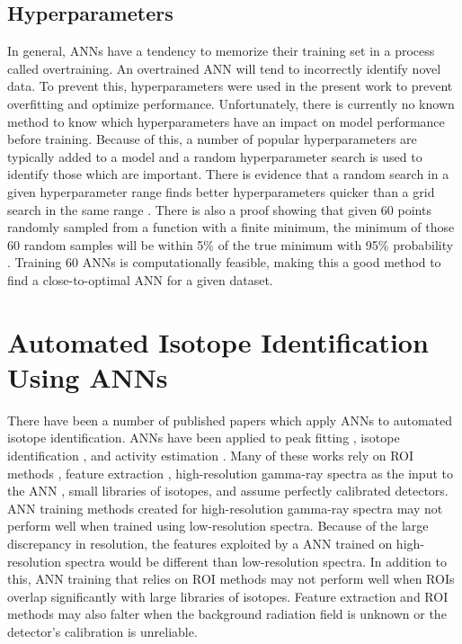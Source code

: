 \documentclass[tocnosub,noragright,centerchapter,12pt,fullpage]{uiucecethesis09}
\begin{document}
\subsection{Hyperparameters}

In general, ANNs have a tendency to memorize their training set in a process called overtraining. An overtrained ANN will tend to incorrectly identify novel data. To prevent this, hyperparameters were used in the present work to prevent overfitting and optimize performance. Unfortunately, there is currently no known method to know which hyperparameters have an impact on model performance before training. Because of this, a number of popular hyperparameters are typically added to a model and a random hyperparameter search is used to identify those which are important. There is evidence that a random search in a given hyperparameter range finds better hyperparameters quicker than a grid search in the same range \cite{Bergstra2012}. There is also a proof showing that given 60 points randomly sampled from a function with a finite minimum, the minimum of those 60 random samples will be within 5\% of the true minimum with 95\% probability \cite{Zheng2015}. Training 60 ANNs is computationally feasible, making this a good method to find a close-to-optimal ANN for a given dataset. 



\section{Automated Isotope Identification Using ANNs}

There have been a number of published papers which apply ANNs to automated isotope identification. ANNs have been applied to peak fitting \cite{Abdel-Aal2002}, isotope identification \cite{Abdel-Aal1996, Medhat2012}, and activity estimation \cite{Abdel-Aal1996, Vigneron1996}. Many of these works rely on ROI methods \cite{Pilato1999}, feature extraction \cite{Chen2009}, high-resolution gamma-ray spectra as the input to the ANN \cite{Yoshida2002}, small libraries of isotopes, and assume perfectly calibrated detectors. ANN training methods created for high-resolution gamma-ray spectra may not perform well when trained using low-resolution spectra. Because of the large discrepancy in resolution, the features exploited by a ANN trained on high-resolution spectra would be different than low-resolution spectra. In addition to this, ANN training that relies on ROI methods may not perform well when ROIs overlap significantly with large libraries of isotopes. Feature extraction and ROI methods may also falter when the background radiation field is unknown or the detector's calibration is unreliable.  
\end{document}
